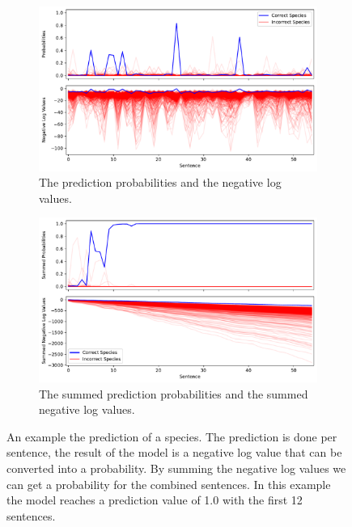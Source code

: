 \documentclass[a4paper, 12pt, oneside]{book} %
\begin{document}
\begin{figure} [htpb]
     \centering
     \begin{subfigure}[b]{1\textwidth}
         \centering
         \includegraphics[width=\textwidth]{figures/probs_nonstacked.pdf}
         \caption{The prediction probabilities and the negative log values.}
         \label{fig:probs_nonstacked}
     \end{subfigure}
     \vfill
     \begin{subfigure}[b]{1\textwidth}
         \centering
         \includegraphics[width=\textwidth]{figures/probs_stacked.pdf}
         \caption{The summed prediction probabilities and the summed negative log values.}
         \label{fig:probs_stacked}
     \end{subfigure}
     \caption[Species Prediction Probabilities]{An example the prediction of a species. The prediction is done per sentence, the result of the model is a negative log value that can be converted into a probability. By summing the negative log values we can get a probability for the combined sentences. In this example the model reaches a prediction value of 1.0 with the first 12 sentences.}
     \label{fig:species_probabilities}
\end{figure}
\end{document}
